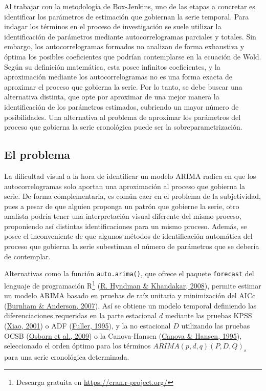 \documentclass[
]{article}
\begin{document}
Al trabajar con la metodología de Box-Jenkins, uno de las etapas a
concretar es identificar los parámetros de estimación que gobiernan la
serie temporal. Para indagar los términos en el proceso de investigación
se suele utilizar la identificación de parámetros mediante
autocorrelogramas parciales y totales. Sin embargo, los
autocorrelogramas formados no analizan de forma exhaustiva y óptima los
posibles coeficientes que podrían contemplarse en la ecuación de Wold.
Según su definición matemática, esta posee infinitos coeficientes, y la
aproximación mediante los autocorrelogramas no es una forma exacta de
aproximar el proceso que gobierna la serie. Por lo tanto, se debe buscar
una alternativa distinta, que opte por aproximar de una mejor manera la
identificación de los parámetros estimados, cubriendo un mayor número de
posibilidades. Una alternativa al problema de aproximar los parámetros
del proceso que gobierna la serie cronológica puede ser la
sobreparametrización.

\subsection{El problema}

La dificultad visual a la hora de identificar un modelo ARIMA radica en
que los autocorrelogramas solo aportan una aproximación al proceso que
gobierna la serie. De forma complementaria, es común caer en el problema
de la subjetividad, pues a pesar de que alguien proponga un patrón que
gobierne la serie, otro analista podría tener una interpretación visual
diferente del mismo proceso, proponiendo así distintas identificaciones
para un mismo proceso. Además, se posee el inconveniente de que algunos
métodos de identificación automática del proceso que gobierna la serie
subestiman el número de parámetros que se debería de contemplar.

Alternativas como la función \texttt{auto.arima()}, que ofrece el
paquete \texttt{forecast} del lenguaje de programación R\footnote{Descarga
  gratuita en \url{https://cran.r-project.org/}}
(\protect\hyperlink{ref-auto.arima}{R. Hyndman \& Khandakar, 2008}),
permite estimar un modelo ARIMA basado en pruebas de raíz unitaria y
minimización del AICc (\protect\hyperlink{ref-burnham2007model}{Burnham
\& Anderson, 2007}). Así se obtiene un modelo temporal definiendo las
diferenciaciones requeridas en la parte estacional \(d\) mediante las
pruebas KPSS
(\protect\hyperlink{ref-doi:10.1111ux2f1467-9892.00213}{Xiao, 2001}) o
ADF (\protect\hyperlink{ref-fuller1995introduction}{Fuller, 1995}), y la
no estacional \(D\) utilizando las pruebas OCSB
(\protect\hyperlink{ref-Osborn2009SEASONALITYAT}{Osborn et al., 2009}) o
la Canova-Hansen (\protect\hyperlink{ref-10.2307ux2f1392184}{Canova \&
Hansen, 1995}), seleccionado el orden óptimo para los términos
\(ARIMA(p, d, q)(P, D, Q)_s\) para una serie cronológica determinada.
\end{document}
